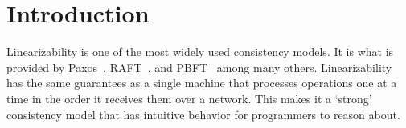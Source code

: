 \section{Introduction}
\label{sec:intro}




Linearizability is one of the most widely used consistency
models. It is what is provided by Paxos~\cite{lamport1998paxos}, RAFT~\cite{ongaro2014raft},
and PBFT~\cite{castro1999pbft} among many others. Linearizability has
the same guarantees as a single machine that processes
operations one at a time in the order it receives them
over a network. This makes it a ‘strong’ consistency
model that has intuitive behavior for programmers
to reason about.


